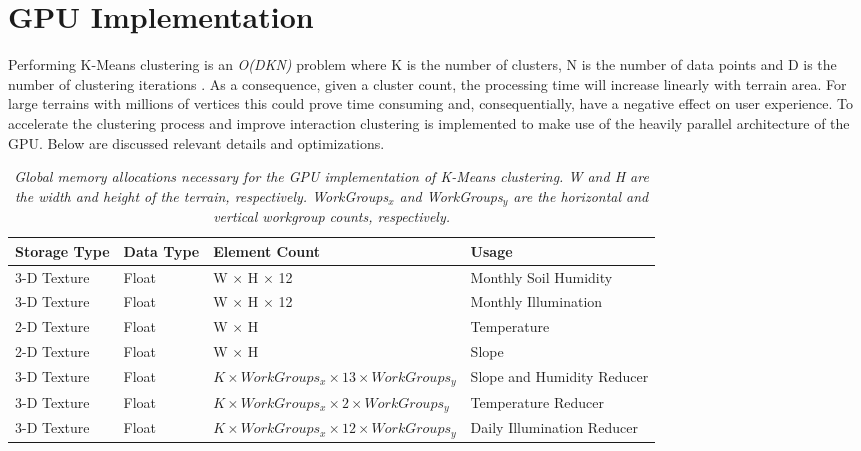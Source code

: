 \section{GPU Implementation} \label{sec:gpu_clustering}

Performing K-Means clustering is an \textit{O(DKN)} problem where K is the number of clusters, N is the number of data points and D is the number of clustering iterations \cite{Xu2005}. As a consequence, given a cluster count, the processing time will increase linearly with terrain area. For large terrains with millions of vertices this could prove time consuming and, consequentially, have a negative effect on user experience. To accelerate the clustering process and improve interaction clustering is implemented to make use of the heavily parallel architecture of the GPU. Below are discussed relevant details and optimizations. \\

\begin{table}[]
  \centering
	    \begin{tabular}{|p{3cm}|p{1.5cm}|p{6cm}|p{5cm}|}
		\hline	
  	    \textbf{Storage Type} &  \textbf{Data Type} & \textbf{Element Count} & \textbf{Usage} \\
		\hline
		3-D Texture & Float & W $\times$ H $\times$ 12 & Monthly Soil Humidity \\
		\hline
		3-D Texture & Float & W $\times$ H $\times$ 12 & Monthly Illumination \\
		\hline
		2-D Texture & Float & W $\times$ H & Temperature \\
		\hline
		2-D Texture & Float & W $\times$ H & Slope \\
		\hline
		3-D Texture & Float & $ \textit{K} \times WorkGroups_{x} \times 13 \times WorkGroups_{y} $ &  Slope and Humidity Reducer \\
		\hline
		3-D Texture & Float & $ \textit{K} \times WorkGroups_{x} \times 2 \times WorkGroups_{y} $ &  Temperature Reducer \\
		\hline
		3-D Texture & Float & $ \textit{K} \times WorkGroups_{x} \times 12 \times WorkGroups_{y} $ & Daily Illumination Reducer \\
		\hline
		\end{tabular}
		\caption{\textit{Global memory allocations necessary for the GPU implementation of K-Means clustering. \textit{W} and \textit{H} are the width and height of the terrain, respectively. \textit{WorkGroups$_{x}$} and \textit{WorkGroups$_{y}$} are the horizontal and vertical workgroup counts, respectively.}}
	  \label{tab:clustering_mem_allocs}
\end{table}

